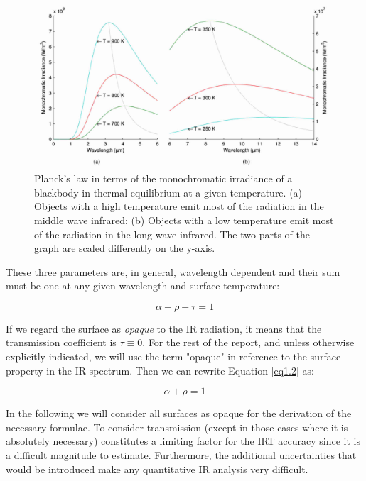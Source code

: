 		\begin{figure}[ht!]
			\centering
			\captionsetup{justification=centering,margin=2cm}
			\includegraphics[scale=0.35]{Figures/Chapter01/PlankFunction.jpg}
			\caption{Planck’s law in terms of the  monochromatic irradiance of  a blackbody in thermal equilibrium at a given temperature. (a) Objects with a high temperature emit most of the radiation in the middle wave infrared; (b) Objects with a low temperature emit most of the radiation in the long wave infrared. The two parts of the graph are scaled differently on the y-axis.}\label{fig1.3}
		\end{figure}		
		
		These three parameters are, in general, wavelength dependent and their sum must be one at any given wavelength and surface temperature:
		
		\begin{equation}\label{eq1.2}
			\alpha + \rho + \tau = 1
		\end{equation}\bigskip
		
		If we regard the surface as \textit{opaque} to the IR radiation, it means that the transmission coefficient is $\tau \equiv 0$. For the rest of the report, and unless otherwise explicitly indicated, we will use the term "opaque" in reference to the surface property in the IR spectrum. Then we can rewrite Equation \ref{eq1.2} as:	
		
		\begin{equation}\label{eq1.3}
			\alpha + \rho = 1
		\end{equation}\bigskip
		
		In the following we will consider all surfaces as opaque for the derivation of the necessary formulae. To consider transmission (except in those cases where it is absolutely necessary) constitutes a limiting factor for the IRT accuracy since it is a difficult magnitude to estimate. Furthermore, the additional uncertainties that would be introduced make any quantitative IR analysis very difficult.
		\bigskip
		

